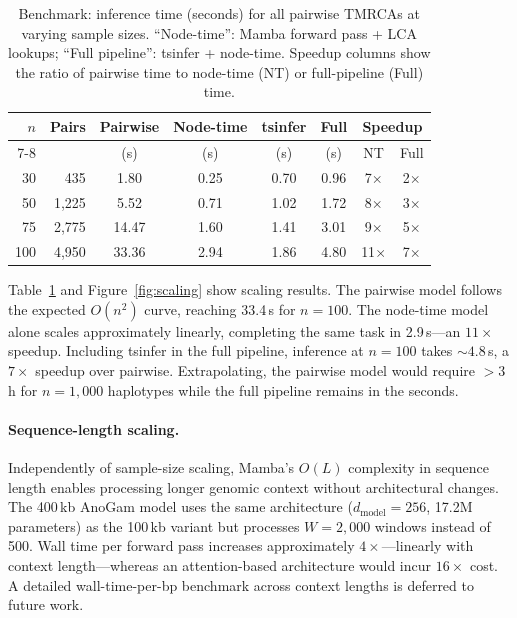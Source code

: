 \documentclass{article}
\begin{document}
\begin{table}[t]
\caption{Benchmark: inference time (seconds) for all pairwise TMRCAs at varying sample sizes.
``Node-time'': Mamba forward pass + LCA lookups; ``Full pipeline'': tsinfer + node-time.
Speedup columns show the ratio of pairwise time to node-time (NT) or full-pipeline (Full) time.}
\label{tab:benchmark}
\centering
\small
\begin{tabular}{rrcccccc}
\toprule
$n$ & Pairs & Pairwise & Node-time & tsinfer & Full & \multicolumn{2}{c}{Speedup} \\
\cmidrule(lr){7-8}
    &       & (s) & (s) & (s) & (s) & NT & Full \\
\midrule
 30 &   435 &  1.80 & 0.25 & 0.70 & 0.96 &  7$\times$ & 2$\times$ \\
 50 & 1{,}225 &  5.52 & 0.71 & 1.02 & 1.72 &  8$\times$ & 3$\times$ \\
 75 & 2{,}775 & 14.47 & 1.60 & 1.41 & 3.01 &  9$\times$ & 5$\times$ \\
100 & 4{,}950 & 33.36 & 2.94 & 1.86 & 4.80 & 11$\times$ & 7$\times$ \\
\bottomrule
\end{tabular}
\end{table}

Table~\ref{tab:benchmark} and Figure~\ref{fig:scaling} show scaling results. The pairwise model
follows the expected $O(n^2)$ curve, reaching 33.4\,s for $n = 100$. The node-time model alone
scales approximately linearly, completing the same task in 2.9\,s---an $11\times$ speedup.
Including tsinfer in the full pipeline, inference at $n = 100$ takes ${\sim}4.8$\,s, a
$7\times$ speedup over pairwise. Extrapolating, the pairwise model would require ${>}3$\,h
for $n = 1{,}000$ haplotypes while the full pipeline remains in the seconds.

\paragraph{Sequence-length scaling.}
Independently of sample-size scaling, Mamba's $O(L)$ complexity in sequence length enables
processing longer genomic context without architectural changes. The 400\,kb AnoGam model uses
the same architecture ($d_\mathrm{model} = 256$, 17.2M parameters) as the 100\,kb variant but
processes $W = 2{,}000$ windows instead of 500. Wall time per forward pass increases approximately
$4\times$---linearly with context length---whereas an attention-based architecture would incur
$16\times$ cost. A detailed wall-time-per-bp benchmark across context lengths is deferred to
future work.
\end{document}
